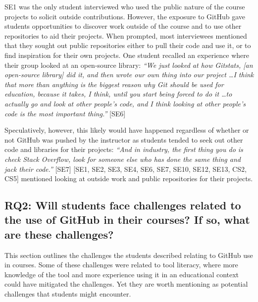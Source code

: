 SE1 was the only student interviewed who used the public nature of the course projects to solicit outside contributions. However, the exposure to GitHub gave students opportunities to discover work outside of the course and to use other repositories to aid their projects. When prompted, most interviewees mentioned that they sought out public repositories either to pull their code and use it, or to find inspiration for their own projects. One student recalled an experience where their group looked at an open-source library: \textit{``We just looked at how Gitstats, [an open-source library] did it, and then wrote our own thing into our project \ldots I think that more than anything is the biggest reason why Git should be used for education, because it takes, I think, until you start being forced to do it \ldots to actually go and look at other people's code, and I think looking at other people's code is the most important thing.''} [SE6]

Speculatively, however, this likely would have happened regardless of whether or not GitHub was pushed by the instructor as students tended to seek out other code and libraries for their projects: \textit{``And in industry, the first thing you do is check Stack Overflow, look for someone else who has done the same thing and jack their code.''} [SE7] [SE1, SE2, SE3, SE4, SE6, SE7, SE10, SE12, SE13, CS2, CS5] mentioned looking at outside work and public repositories for their projects.

\subsection{RQ2: Will students face challenges related to the use of GitHub in their courses? If so, what are these challenges?}
This section outlines the challenges the students described relating to GitHub use in courses. Some of these challenges were related to tool literacy, where more knowledge of the tool and more experience using it in an educational context could have mitigated the challenges. Yet they are worth mentioning as potential challenges that students might encounter. \\

